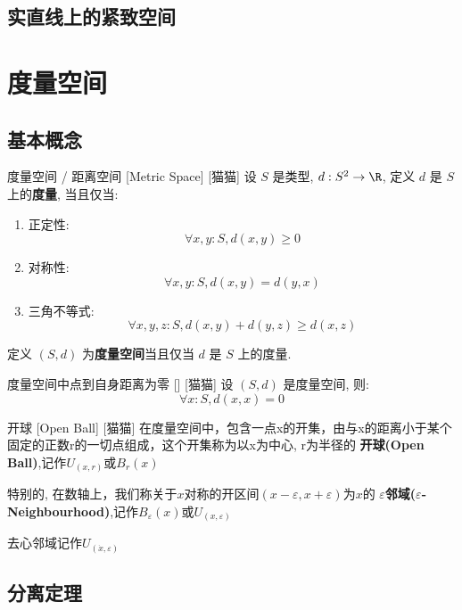 \documentclass[UTF8]{ctexart}
\begin{document}
        \subsection{实直线上的紧致空间}
            
                

    \section{度量空间}
        
        \subsection{基本概念}
            
            \begin{dfn}
                {度量空间 / 距离空间}
                [Metric Space]
                [猫猫]
                设 \(S\) 是类型, $d:S^2\to\R$, 定义 $d$ 是 $S$ 上的\textbf{度量}, 当且仅当: 
                \begin{enumerate}
                    \item 正定性: 
                    \[\forall x,y:S, d(x,y)\geq 0\]
    
                    \item 对称性: 
                    \[\forall x,y:S, d(x,y)=d(y,x)\]
    
                    \item 三角不等式: 
                    \[\forall x,y,z:S, d(x,y)+d(y,z)\geq d(x,z)\]
                \end{enumerate}

                定义 $(S,d)$ 为\textbf{度量空间}当且仅当 $d$ 是 $S$ 上的度量. 
            \end{dfn}

            \begin{ppt}
                [MetricReflexivity]
                {度量空间中点到自身距离为零}
                []
                [猫猫]
                设 $(S,d)$ 是度量空间, 则: 
                \[\forall x:S, d(x,x)=0\]
            \end{ppt}

            \begin{dfn}
                [OpenBall]
				{开球}
                [Open Ball]
                [猫猫]
				在度量空间中，包含一点x的开集，由与x的距离小于某个固定的正数r的一切点组成，这个开集称为以x为中心, r为半径的 \textbf{开球(Open Ball)},记作\(U_(x,r)\)或\(B_{r}(x)\)

				特别的, 在数轴上，我们称关于\(x\)对称的开区间\((x-\varepsilon,x+\varepsilon)\)为\(x\)的 \textbf{\(\varepsilon\)邻域(\(\varepsilon\)-Neighbourhood)},记作\(B_{\varepsilon}(x)\)或\(U_(x,\varepsilon)\)

				去心邻域记作\(U_(\dot{x},\varepsilon)\)
		\end{dfn}

        \subsection{分离定理}
            
\end{document}
